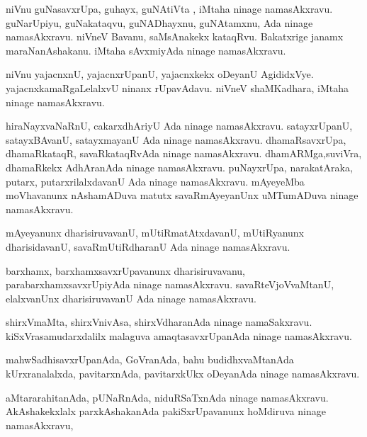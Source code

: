 \documentclass{article}
\begin{document}
\begin{mn}
niVnu guNasavxrUpa,  guhayx,  guNAtiVta ,  iMtaha  ninage namasAkxravu. guNarUpiyu, 
guNakataqvu, guNADhayxnu, guNAtamxnu, Ada  ninage namasAkxravu.  niVneV Bavanu, 
saMsAnakekx kataqRvu. Bakatxrige janamx maraNanAshakanu.  iMtaha sAvxmiyAda  ninage namasAkxravu.
\end{mn}

\begin{mn}
niVnu yajacnxnU, yajacnxrUpanU, yajacnxkekx  oDeyanU AgididxVye. yajacnxkamaRgaLelalxvU 
ninanx rUpavAdavu. niVneV shaMKadhara, iMtaha ninage namasAkxravu.
\end{mn}

\begin{mn}
hiraNayxvaNaRnU, cakarxdhAriyU Ada ninage namasAkxravu. satayxrUpanU, satayxBAvanU, 
satayxmayanU Ada ninage namasAkxravu.  dhamaRsavxrUpa, dhamaRkataqR, savaRkataqRvAda 
ninage namasAkxravu. dhamARMga,suviVra, dhamaRkekx AdhAranAda ninage namasAkxravu.  
puNayxrUpa, narakatAraka, putarx, putarxrilalxdavanU Ada ninage namasAkxravu.  
mAyeyeMba moVhavanunx nAshamADuva matutx savaRmAyeyanUnx uMTumADuva ninage namasAkxravu.
\end{mn}

\begin{mn}
mAyeyanunx dharisiruvavanU, mUtiRmatAtxdavanU, mUtiRyanunx dharisidavanU, 
savaRmUtiRdharanU Ada ninage namasAkxravu.
\end{mn}

\begin{mn}
barxhamx, barxhamxsavxrUpavanunx dharisiruvavanu,  parabarxhamxsavxrUpiyAda 
ninage namasAkxravu.  savaRteVjoVvaMtanU, elalxvanUnx dharisiruvavanU Ada ninage namasAkxravu.
\end{mn}

\begin{mn}
shirxVmaMta, shirxVnivAsa, shirxVdharanAda ninage namaSakxravu.  kiSxVrasamudarxdalilx 
malaguva amaqtasavxrUpanAda ninage namasAkxravu.
\end{mn}

\begin{mn}
mahwSadhisavxrUpanAda, GoVranAda, bahu budidhxvaMtanAda kUrxranalalxda, 
pavitarxnAda, pavitarxkUkx oDeyanAda ninage namasAkxravu.
\end{mn}

\begin{mn}
aMtararahitanAda, pUNaRnAda, niduRSaTxnAda ninage namasAkxravu.  AkAshakekxlalx 
parxkAshakanAda pakiSxrUpavanunx hoMdiruva ninage namasAkxravu,
\end{mn}
\end{document}
